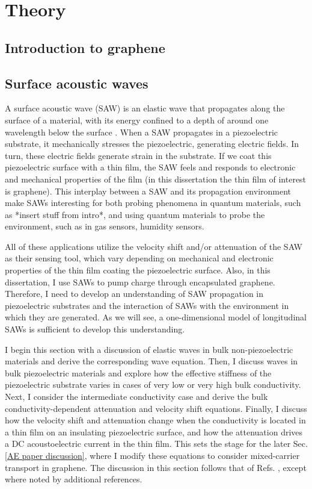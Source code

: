 \documentclass[double,12pt,1in]{beavtex}
\begin{document}
\chapter{Theory}

\section{Introduction to graphene}

\section{Surface acoustic waves}

A surface acoustic wave (SAW) is an elastic wave that propagates along the surface of a material, with its energy confined to a depth of around one wavelength below the surface \cite{rayleigh_waves_1885}. When a SAW propagates in a piezoelectric substrate, it mechanically stresses the piezoelectric, generating electric fields. In turn, these electric fields generate strain in the substrate. If we coat this piezoelectric surface with a thin film, the SAW feels and responds to electronic and mechanical properties of the film (in this dissertation the thin film of interest is graphene). This interplay between a SAW and its propagation environment make SAWs interesting for both probing phenomena in quantum materials, such as *insert stuff from intro*, and using quantum materials to probe the environment, such as in gas sensors, humidity sensors.

All of these applications utilize the velocity shift and/or attenuation of the SAW as their sensing tool, which vary depending on mechanical and electronic properties of the thin film coating the piezoelectric surface. Also, in this dissertation, I use SAWs to pump charge through encapsulated graphene. Therefore, I need to develop an understanding of SAW propagation in piezoelectric substrates and the interaction of SAWs with the environment in which they are generated. As we will see, a one-dimensional model of longitudinal SAWs is sufficient to develop this understanding. 

I begin this section with a discussion of elastic waves in bulk non-piezoelectric materials and derive the corresponding wave equation. Then, I discuss waves in bulk piezoelectric materials and explore how the effective stiffness of the piezoelectric substrate varies in cases of very low or very high bulk conductivity. Next, I consider the intermediate conductivity case and derive the bulk conductivity-dependent attenuation and velocity shift equations. Finally, I discuss how the velocity shift and attenuation change when the conductivity is located in a thin film on an insulating piezoelectric surface, and how the attenuation drives a DC acoustoelectric current in the thin film. This sets the stage for the later Sec. \ref{AE paper discussion}, where I modify these equations to consider mixed-carrier transport in graphene. The discussion in this section follows that of Refs. \cite{weinreich_acoustodynamic_1956, hutson_elastic_1962, wixforth_surface_1989}, except where noted by additional references.
\end{document}
